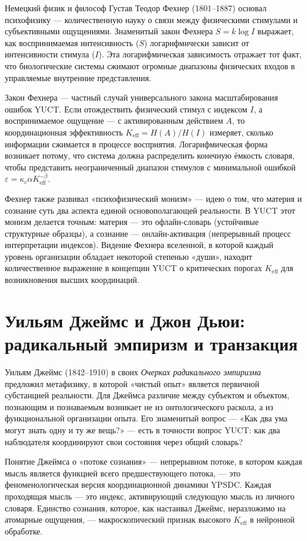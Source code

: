 \documentclass[12pt,a4paper]{article}
\begin{document}
	Немецкий физик и философ Густав Теодор Фехнер (1801–1887) основал психофизику — количественную науку о связи между физическими стимулами и субъективными ощущениями. Знаменитый закон Фехнера \(S = k \log I\) выражает, как воспринимаемая интенсивность (\(S\)) логарифмически зависит от интенсивности стимула (\(I\)). Эта логарифмическая зависимость отражает тот факт, что биологические системы сжимают огромные диапазоны физических входов в управляемые внутренние представления.
	
	Закон Фехнера — частный случай универсального закона масштабирования ошибок YUCT. Если отождествить физический стимул с индексом \(I\), а воспринимаемое ощущение — с активированным действием \(A\), то координационная эффективность \(K_{\mathrm{eff}} = H(A)/H(I)\) измеряет, сколько информации сжимается в процессе восприятия. Логарифмическая форма возникает потому, что система должна распределить конечную ёмкость словаря, чтобы представить неограниченный диапазон стимулов с минимальной ошибкой \(\varepsilon = \kappa_c \alpha K_{\mathrm{eff}}^{-\beta}\).
	
	Фехнер также развивал «психофизический монизм» — идею о том, что материя и сознание суть два аспекта единой основополагающей реальности. В YUCT этот монизм делается точным: материя — это офлайн-словарь (устойчивые структурные образцы), а сознание — онлайн-активация (непрерывный процесс интерпретации индексов). Видение Фехнера вселенной, в которой каждый уровень организации обладает некоторой степенью «души», находит количественное выражение в концепции YUCT о критических порогах \(K_{\mathrm{eff}}\) для возникновения высших координаций.
	
	\section{Уильям Джеймс и Джон Дьюи: радикальный эмпиризм и транзакция}
	
	Уильям Джеймс (1842–1910) в своих \emph{Очерках радикального эмпиризма} предложил метафизику, в которой «чистый опыт» является первичной субстанцией реальности. Для Джеймса различие между субъектом и объектом, познающим и познаваемым возникает не из онтологического раскола, а из функциональной организации опыта. Его знаменитый вопрос — «Как два ума могут знать одну и ту же вещь?» — есть в точности вопрос YUCT: как два наблюдателя координируют свои состояния через общий словарь?
	
	Понятие Джеймса о «потоке сознания» — непрерывном потоке, в котором каждая мысль является функцией всего предшествующего потока, — это феноменологическая версия координационной динамики YPSDC. Каждая проходящая мысль — это индекс, активирующий следующую мысль из личного словаря. Единство сознания, которое, как настаивал Джеймс, неразложимо на атомарные ощущения, — макроскопический признак высокого \(K_{\mathrm{eff}}\) в нейронной обработке.
	
\end{document}
